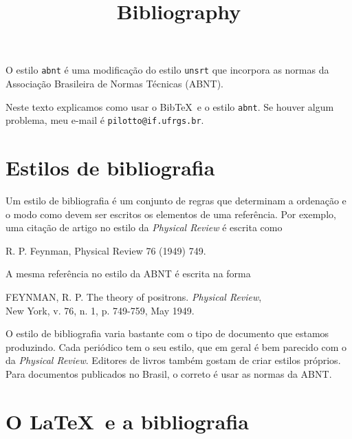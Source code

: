 \documentclass[a4paper,12pt]{article}
\newcommand{\ca}{\c{c}\~ao}
\begin{document}
\title{Bibliography}
\maketitle

O estilo \verb+abnt+ \'e uma modifica{\ca} do estilo \verb+unsrt+ que
incorpora as normas da Associa{\ca} Brasileira de Normas T\'ecnicas (ABNT).

Neste texto explicamos como usar o Bib\TeX\ e o estilo \verb+abnt+.
Se houver algum problema, meu e-mail \'e
\verb+pilotto@if.ufrgs.br+.


\tableofcontents

\newpage



\section{Estilos de bibliografia}


Um estilo de bibliografia \'e um conjunto de regras que determinam
a ordena{\ca} e o modo como devem ser escritos os elementos 
de uma refer\^encia. Por exemplo, uma cita{\ca} de artigo no estilo
da {\it Physical Review} \'e escrita como
\begin{center}
R. P. Feynman, Physical Review 76 (1949) 749.
\end{center}
A mesma refer\^encia no estilo da ABNT \'e escrita na forma
\begin{center}
\parbox{0.8\textwidth}{
FEYNMAN, R. P. The theory of positrons. {\it Physical Review}, \\
New York, v. 76, n. 1, p. 749-759, May 1949.}
\end{center}
O estilo de bibliografia varia bastante com o tipo de documento que
estamos produzindo.
Cada peri\'odico tem o seu estilo, que em geral \'e bem 
parecido com o da {\it Physical Review}. Editores de livros
tamb\'em gostam de criar estilos pr\'oprios. Para documentos
publicados no Brasil, o correto \'e usar as normas da ABNT.




\section{O \LaTeX\ e a bibliografia}
\end{document}
